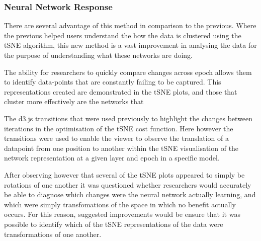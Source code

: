\documentclass[a4paper,11pt,titlepage]{article}
\begin{document}
	
	\begin{figure}[H]
    			\centering	
    			\qquad

    			\caption{}%
    			\label{fig:pca_varimax}
	\end{figure}
	
	
		\subsubsection{Neural Network Response}
		There are several advantage of this method in comparison to the previous. Where the previous helped users understand the how the data is clustered using the tSNE algorithm, this new method is a vast improvement in analysing the data for the purpose of understanding what these networks are doing.
		\par 
		The ability for researchers to quickly compare changes across epoch allows them to identify data-points that are constantly failing to be captured. This representations created are demonstrated in the tSNE plots, and those that cluster more effectively are the networks that
		\par 
		The d3.js transitions that were used previously to highlight the changes between iterations in the optimisation of the tSNE cost function. Here however the transitions were used to enable the viewer to observe the translation of a datapoint from one position to another within the tSNE visualisation of the network representation at a given layer and epoch in a specific model.
		\par 
		After observing however that several of the tSNE plots appeared to simply be rotations of one another it was questioned whether researchers would accurately be able to diagnose which changes were the neural network actually learning, and which were simply transfomations of the space in which no benefit actually occurs. For this reason, suggested improvements would be ensure that it was possible to identify which of the tSNE representations of the data were transformations of one another.
\end{document}
